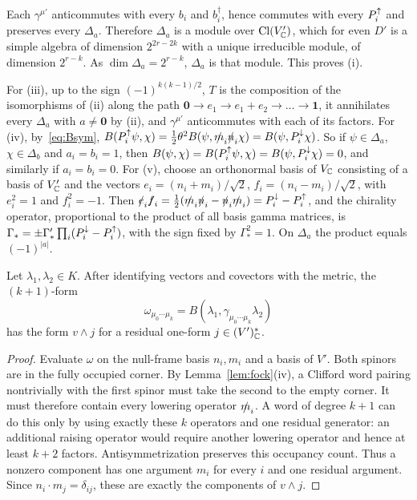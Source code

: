 Each $\gamma^{\mu'}$ anticommutes with every $b_i$ and $b_i^\dagger$, hence commutes with every $P^{\uparrow}_i$ and preserves every $\Delta_a$. Therefore $\Delta_a$ is a module over $\operatorname{Cl}(V'_{\mathbb{C}})$, which for even $D'$ is a simple algebra of dimension $2^{2r-2k}$ with a unique irreducible module, of dimension $2^{r-k}$. As $\dim\Delta_a=2^{r-k}$, $\Delta_a$ is that module. This proves (i).

For (iii), up to the sign $(-1)^{k(k-1)/2}$, $T$ is the composition of the isomorphisms of (ii) along the path $\mathbf 0\to e_1\to e_1+e_2\to\dots\to\mathbf 1$, it annihilates every $\Delta_a$ with $a\ne\mathbf 0$ by (ii), and $\gamma^{\mu'}$ anticommutes with each of its factors. For (iv), by~\eqref{eq:Bsym}, $B(P^{\uparrow}_i\psi,\chi)=\frac12\theta^2B(\psi,\slashed{m}_i\slashed{n}_i\chi)=B(\psi,P^{\downarrow}_i\chi)$. So if $\psi\in\Delta_a$, $\chi\in\Delta_b$ and $a_i=b_i=1$, then $B(\psi,\chi)=B(P^{\uparrow}_i\psi,\chi)=B(\psi,P^{\downarrow}_i\chi)=0$, and similarly if $a_i=b_i=0$. For (v), choose an orthonormal basis of $V_{\mathbb{C}}$ consisting of a basis of $V'_{\mathbb{C}}$ and the vectors $e_i=(n_i+m_i)/\sqrt2$, $f_i=(n_i-m_i)/\sqrt2$, with $e_i^2=1$ and $f_i^2=-1$. Then $\slashed e_i\slashed f_i=\frac12(\slashed{m}_i\slashed{n}_i-\slashed{n}_i\slashed{m}_i)=P^{\downarrow}_i-P^{\uparrow}_i$, and the chirality operator, proportional to the product of all basis gamma matrices, is $\Gamma_*=\pm\Gamma'_*\prod_i(P^{\downarrow}_i-P^{\uparrow}_i)$, with the sign fixed by $\Gamma_*^2=1$. On $\Delta_a$ the product equals $(-1)^{|a|}$.

\begin{lemma}\label{lem:nullcurrent}
Let $\lambda_1,\lambda_2\in K$. After identifying vectors and covectors with the metric, the $(k+1)$-form
\[
 \omega_{\mu_0\cdots\mu_k}
   =B(\lambda_1,\gamma_{\mu_0\cdots\mu_k}\lambda_2)
\]
has the form $v\wedge j$ for a residual one-form $j\in(V')^*_{\mathbb{C}}$.
\end{lemma}
\begin{proof}
Evaluate $\omega$ on the null-frame basis $n_i,m_i$ and a basis of $V'$. Both spinors are in the fully occupied corner. By Lemma~\ref{lem:fock}(iv), a Clifford word pairing nontrivially with the first spinor must take the second to the empty corner. It must therefore contain every lowering operator $\slashed{m}_i$. A word of degree $k+1$ can do this only by using exactly these $k$ operators and one residual generator: an additional raising operator would require another lowering operator and hence at least $k+2$ factors. Antisymmetrization preserves this occupancy count. Thus a nonzero component has one argument $m_i$ for every $i$ and one residual argument. Since $n_i\cdot m_j=\delta_{ij}$, these are exactly the components of $v\wedge j$.
\end{proof}

